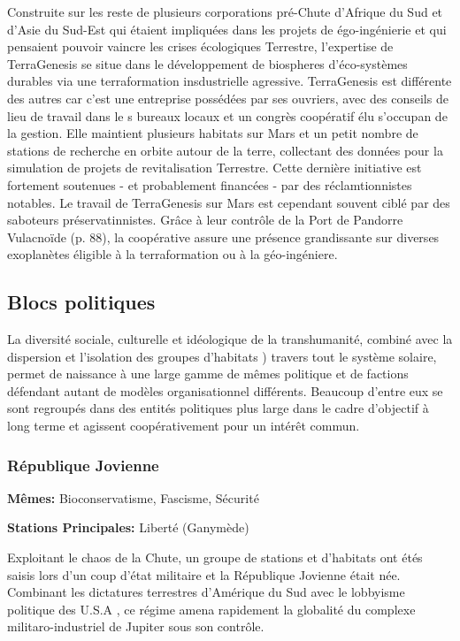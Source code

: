 Construite sur les reste de plusieurs corporations pré-Chute d'Afrique du Sud et d'Asie du Sud-Est qui étaient impliquées dans les projets de égo-ingénierie et qui pensaient pouvoir vaincre les crises écologiques Terrestre, l'expertise de TerraGenesis se situe dans le développement de biospheres d'éco-systèmes durables via une terraformation insdustrielle agressive. TerraGenesis est différente des autres car c'est une entreprise possédées par ses ouvriers, avec des conseils de lieu de travail dans le s bureaux locaux et un congrès coopératif élu s'occupan de la gestion. Elle maintient plusieurs habitats sur Mars et un petit nombre de stations de recherche en orbite autour de la terre, collectant des données pour la simulation de projets de revitalisation Terrestre. Cette dernière initiative est fortement soutenues - et probablement financées - par des réclamtionnistes notables. Le travail de TerraGenesis sur Mars est cependant souvent ciblé par des saboteurs préservatinnistes. Grâce à leur contrôle de la Port de Pandorre Vulacnoïde (p. 88), la coopérative assure une présence grandissante sur diverses exoplanètes éligible à la terraformation ou à la géo-ingéniere. 

\subsection{Blocs politiques} \label{sec:political-blocs-1} 

La diversité sociale, culturelle et idéologique de la transhumanité, combiné avec la dispersion et l'isolation des groupes d'habitats ) travers tout le système solaire, permet de naissance à une large gamme de mêmes politique et de factions défendant autant de modèles organisationnel différents. Beaucoup d'entre eux se sont regroupés dans des entités politiques plus large dans le cadre d'objectif à long terme et agissent coopérativement pour un intérêt commun. 

\subsubsection{République Jovienne} \label{sec:jovian-republic} 

\textbf{Mêmes:} Bioconservatisme, Fascisme, Sécurité 

\textbf{Stations Principales: } Liberté (Ganymède) 

Exploitant le chaos de la Chute, un groupe de stations et d'habitats ont étés saisis lors d'un coup d'état militaire et la République Jovienne était née. Combinant les dictatures terrestres d'Amérique du Sud avec le lobbyisme politique des U.S.A , ce régime amena rapidement la globalité du complexe militaro-industriel de Jupiter sous son contrôle. 

